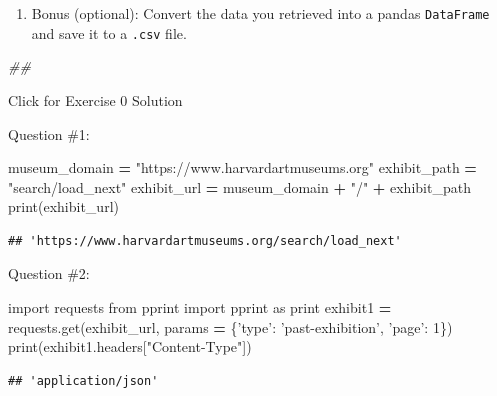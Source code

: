 \documentclass[]{book}
\newenvironment{Shaded}{\begin{snugshade}}{\end{snugshade}}
\newcommand{\BuiltInTok}[1]{#1}
\newcommand{\CommentTok}[1]{\textcolor[rgb]{0.56,0.35,0.01}{\textit{#1}}}
\newcommand{\DecValTok}[1]{\textcolor[rgb]{0.00,0.00,0.81}{#1}}
\newcommand{\ImportTok}[1]{#1}
\newcommand{\NormalTok}[1]{#1}
\newcommand{\OperatorTok}[1]{\textcolor[rgb]{0.81,0.36,0.00}{\textbf{#1}}}
\newcommand{\StringTok}[1]{\textcolor[rgb]{0.31,0.60,0.02}{#1}}
\providecommand{\tightlist}{%
  \setlength{\itemsep}{0pt}\setlength{\parskip}{0pt}}
\begin{document}
\begin{enumerate}
\def\labelenumi{\arabic{enumi}.}
\setcounter{enumi}{3}
\tightlist
\item
  Bonus (optional): Convert the data you retrieved into a pandas
  \texttt{DataFrame} and save it to a \texttt{.csv} file.
\end{enumerate}

\begin{Shaded}
\begin{Highlighting}[]
\CommentTok{##}
\end{Highlighting}
\end{Shaded}

{Click for Exercise 0 Solution}

Question \#1:

\begin{Shaded}
\begin{Highlighting}[]
\NormalTok{museum_domain }\OperatorTok{=} \StringTok{"https://www.harvardartmuseums.org"}
\NormalTok{exhibit_path }\OperatorTok{=} \StringTok{"search/load_next"}
\NormalTok{exhibit_url }\OperatorTok{=}\NormalTok{ museum_domain }\OperatorTok{+} \StringTok{"/"} \OperatorTok{+}\NormalTok{ exhibit_path}
\BuiltInTok{print}\NormalTok{(exhibit_url)}
\end{Highlighting}
\end{Shaded}

\begin{verbatim}
## 'https://www.harvardartmuseums.org/search/load_next'
\end{verbatim}

Question \#2:

\begin{Shaded}
\begin{Highlighting}[]
\ImportTok{import}\NormalTok{ requests}
\ImportTok{from}\NormalTok{ pprint }\ImportTok{import}\NormalTok{ pprint }\ImportTok{as} \BuiltInTok{print} 
\NormalTok{exhibit1 }\OperatorTok{=}\NormalTok{ requests.get(exhibit_url, params }\OperatorTok{=}\NormalTok{ \{}\StringTok{'type'}\NormalTok{: }\StringTok{'past-exhibition'}\NormalTok{, }\StringTok{'page'}\NormalTok{: }\DecValTok{1}\NormalTok{\})}
\BuiltInTok{print}\NormalTok{(exhibit1.headers[}\StringTok{"Content-Type"}\NormalTok{])}
\end{Highlighting}
\end{Shaded}

\begin{verbatim}
## 'application/json'
\end{verbatim}
\end{document}
